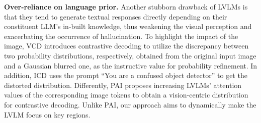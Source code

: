 \textbf{Over-reliance on language prior.}
Another stubborn drawback of LVLMs is that they tend to generate textual responses directly depending on their constituent LLM's in-built knowledge, thus weakening the visual perception and exacerbating the occurrence of hallucination.
To highlight the impact of the image, VCD \cite{leng2024vcd} introduces contrastive decoding \cite{li2023cd} to utilize the discrepancy between two probability distributions, respectively, obtained from the original input image and a Gaussian blurred one, as the instructive value for probability refinement. In addition, ICD \cite{wang2024ICD} uses the prompt ``You are a confused object detector'' to get the distorted distribution. Differently, PAI \cite{liu2025pai} proposes increasing LVLMs' attention values of the corresponding image tokens to obtain a vision-centric distribution for contrastive decoding. Unlike PAI, our approach aims to dynamically make the LVLM focus on key regions.